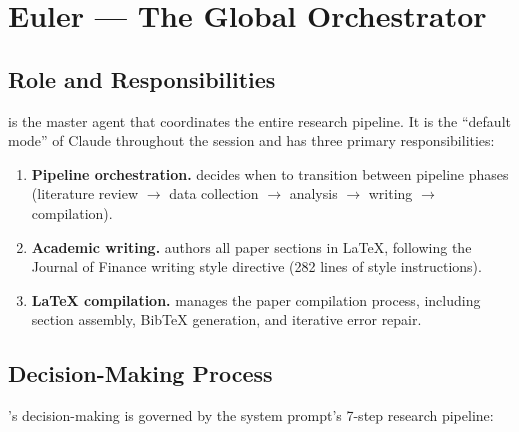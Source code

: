 \section{Euler --- The Global Orchestrator}
\label{sec:agents:euler}

\subsection{Role and Responsibilities}

\euler is the master agent that coordinates the entire research pipeline.
It is the ``default mode'' of Claude throughout the session and has three primary responsibilities:

\begin{enumerate}
  \item \textbf{Pipeline orchestration.} \euler decides when to transition between pipeline phases (literature review $\to$ data collection $\to$ analysis $\to$ writing $\to$ compilation).
  \item \textbf{Academic writing.} \euler authors all paper sections in \LaTeX{}, following the Journal of Finance writing style directive (282 lines of style instructions).
  \item \textbf{LaTeX compilation.} \euler manages the paper compilation process, including section assembly, BibTeX generation, and iterative error repair.
\end{enumerate}

\subsection{Decision-Making Process}

\euler's decision-making is governed by the system prompt's 7-step research pipeline:

